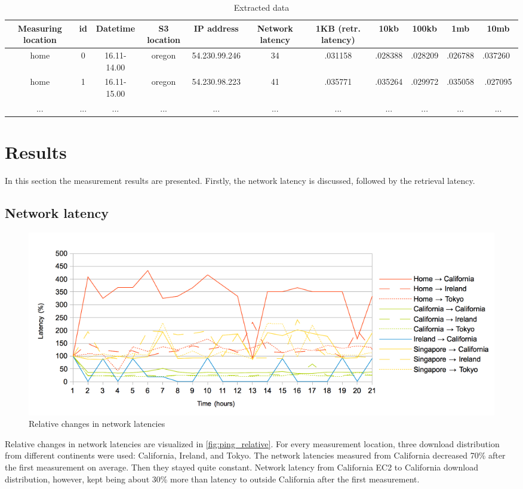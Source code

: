\documentclass[conference]{IEEEtran}
\begin{document}
\begin{table}
\renewcommand{\arraystretch}{1.3}
\caption{Extracted data}
\centering
\begin{tabular}{|c|c|c|c|c|c|c|c|c|c|c|}
\hline
\bfseries Measuring location & \bfseries id & \bfseries Datetime & \bfseries S3 location & \bfseries IP address & \bfseries Network latency & \bfseries 1KB (retr. latency) & \bfseries 10kb & \bfseries 100kb & \bfseries 1mb & \bfseries 10mb \\
\hline\hline
home & 0 & 16.11-14.00 & oregon & 54.230.99.246 & 34 & .031158 & .028388 & .028209 & .026788 & .037260 \\
\hline
home & 1 & 16.11-15.00 & oregon & 54.230.98.223 & 41 & .035771 & .035264 & .029972 & .035058 & .027095 \\
\hline
... & ... & ... & ... & ... & ... & ... & ... & ... & ... & ... \\
\hline
\end{tabular}
\label{table:extracteddata}
\end{table}


\section{Results}
In this section the measurement results are presented. Firstly, the network latency is discussed, followed by the retrieval latency.

\subsection{Network latency}

\begin{figure}[h]
    \centering
    \includegraphics[width=\linewidth]{images/pings_relative.png}
    \caption[]{Relative changes in network latencies}
    \label{fig:ping_relative}
\end{figure}

Relative changes in network latencies are visualized in \autoref{fig:ping_relative}. For every measurement location, three download distribution from different continents were used: California, Ireland, and Tokyo. The network latencies measured from California decreased 70\% after the first measurement on average. Then they stayed quite constant. Network latency from California EC2 to California download distribution, however, kept being about 30\% more than latency to outside California after the first measurement.
\end{document}
